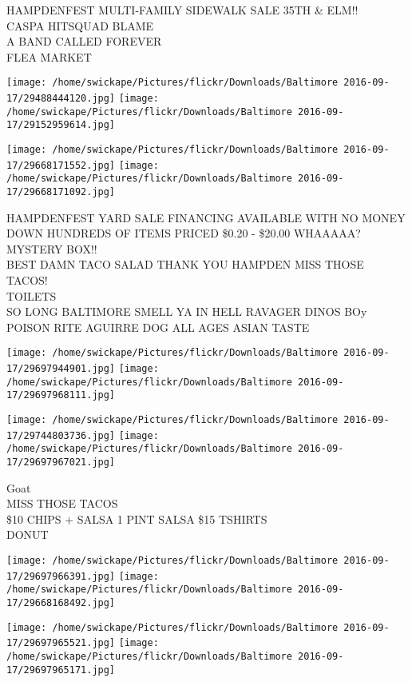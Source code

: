 \documentclass[10pt,letterpaper]{article}
\begin{document}
HAMPDENFEST MULTI{-}FAMILY SIDEWALK SALE 35TH \& ELM!!\\
CASPA HITSQUAD BLAME\\
A BAND CALLED FOREVER\\
FLEA MARKET\\
\pagebreak

\texttt{[image: /home/swickape/Pictures/flickr/Downloads/Baltimore 2016-09-17/29488444120.jpg]}
\texttt{[image: /home/swickape/Pictures/flickr/Downloads/Baltimore 2016-09-17/29152959614.jpg]}

\texttt{[image: /home/swickape/Pictures/flickr/Downloads/Baltimore 2016-09-17/29668171552.jpg]}
\texttt{[image: /home/swickape/Pictures/flickr/Downloads/Baltimore 2016-09-17/29668171092.jpg]}

HAMPDENFEST YARD SALE FINANCING AVAILABLE WITH NO MONEY DOWN HUNDREDS OF ITEMS PRICED \$0.20 {-} \$20.00 WHAAAAA?  MYSTERY BOX!!\\
BEST DAMN TACO SALAD THANK YOU HAMPDEN MISS THOSE TACOS!\\
TOILETS\\
SO LONG BALTIMORE SMELL YA IN HELL RAVAGER DINOS BOy POISON RITE AGUIRRE DOG ALL AGES ASIAN TASTE\\
\pagebreak

\texttt{[image: /home/swickape/Pictures/flickr/Downloads/Baltimore 2016-09-17/29697944901.jpg]}
\texttt{[image: /home/swickape/Pictures/flickr/Downloads/Baltimore 2016-09-17/29697968111.jpg]}

\texttt{[image: /home/swickape/Pictures/flickr/Downloads/Baltimore 2016-09-17/29744803736.jpg]}
\texttt{[image: /home/swickape/Pictures/flickr/Downloads/Baltimore 2016-09-17/29697967021.jpg]}

Goat\\
MISS THOSE TACOS\\
\$10 CHIPS + SALSA 1 PINT SALSA \$15 TSHIRTS\\
DONUT\\
\pagebreak

\texttt{[image: /home/swickape/Pictures/flickr/Downloads/Baltimore 2016-09-17/29697966391.jpg]}
\texttt{[image: /home/swickape/Pictures/flickr/Downloads/Baltimore 2016-09-17/29668168492.jpg]}

\texttt{[image: /home/swickape/Pictures/flickr/Downloads/Baltimore 2016-09-17/29697965521.jpg]}
\texttt{[image: /home/swickape/Pictures/flickr/Downloads/Baltimore 2016-09-17/29697965171.jpg]}
\end{document}
